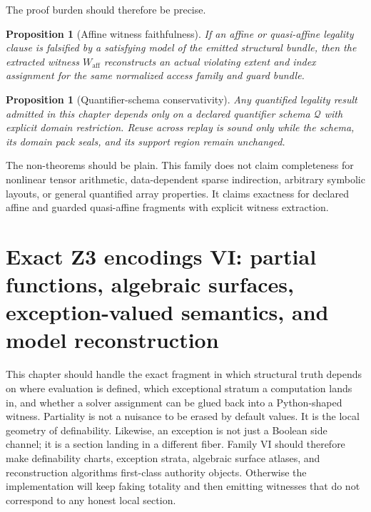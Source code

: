 \documentclass[11pt]{report}
\newtheorem{proposition}[definition]{Proposition}
\begin{document}
The proof burden should therefore be precise.
\begin{proposition}[Affine witness faithfulness]
If an affine or quasi-affine legality clause is falsified by a satisfying model of the emitted structural bundle, then the extracted witness $W_{\mathrm{aff}}$ reconstructs an actual violating extent and index assignment for the same normalized access family and guard bundle.
\end{proposition}

\begin{proposition}[Quantifier-schema conservativity]
Any quantified legality result admitted in this chapter depends only on a declared quantifier schema $\mathcal{Q}$ with explicit domain restriction. Reuse across replay is sound only while the schema, its domain pack seals, and its support region remain unchanged.
\end{proposition}

The non-theorems should be plain. This family does not claim completeness for nonlinear tensor arithmetic, data-dependent sparse indirection, arbitrary symbolic layouts, or general quantified array properties. It claims exactness for declared affine and guarded quasi-affine fragments with explicit witness extraction.
\chapter{Exact Z3 encodings VI: partial functions, algebraic surfaces, exception-valued semantics, and model reconstruction}
This chapter should handle the exact fragment in which structural truth depends on where evaluation is defined, which exceptional stratum a computation lands in, and whether a solver assignment can be glued back into a Python-shaped witness. Partiality is not a nuisance to be erased by default values. It is the local geometry of definability. Likewise, an exception is not just a Boolean side channel; it is a section landing in a different fiber. Family VI should therefore make definability charts, exception strata, algebraic surface atlases, and reconstruction algorithms first-class authority objects. Otherwise the implementation will keep faking totality and then emitting witnesses that do not correspond to any honest local section.
\end{document}
